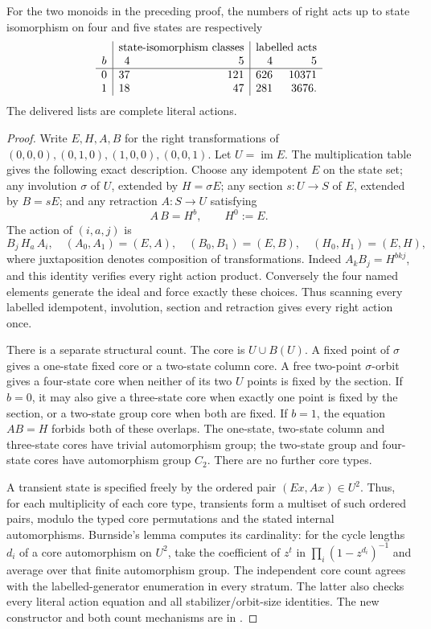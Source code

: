 \begin{lemma}
\label{CP2:A-C2-Rees-nine-acts}
For the two monoids in the preceding proof, the numbers of
right acts up to state isomorphism on four and five states
are respectively
\[
\begin{array}{c|rr|rr}
 &\multicolumn{2}{c|}{\text{state-isomorphism classes}}
 &\multicolumn{2}{c}{\text{labelled acts}}\\
 b&4&5&4&5\\\hline
 0&37&121&626&10371\\
 1&18&47&281&3676.
\end{array}
\]
The delivered lists are complete literal actions.
\end{lemma}
\begin{proof}
Write $E,H,A,B$ for the right transformations of
$(0,0,0),(0,1,0),(1,0,0),(0,0,1)$. Let $U=\operatorname{im}E$.
The multiplication table gives the following exact description.
Choose any idempotent $E$ on the state set; any involution
$\sigma$ of $U$, extended by $H=\sigma E$; any section
$s:U\to S$ of $E$, extended by $B=sE$; and any retraction
$A:S\to U$ satisfying
\[
 A\,B=H^b,
 \qquad H^0:=E.
\]
The action of $(i,a,j)$ is
\[
 B_j\,H_a\,A_i,
 \quad (A_0,A_1)=(E,A),\quad
 (B_0,B_1)=(E,B),\quad (H_0,H_1)=(E,H),
\]
where juxtaposition denotes composition of transformations.
Indeed $A_kB_j=H^{bkj}$, and this identity verifies every
right action product. Conversely the four named elements
generate the ideal and force exactly these choices. Thus
scanning every labelled idempotent, involution, section and
retraction gives every right action once.

There is a separate structural count. The core is
$U\cup B(U)$. A fixed point of $\sigma$ gives a one-state
fixed core or a two-state column core. A free two-point
$\sigma$-orbit gives a four-state core when neither of
its two $U$ points is fixed by the section. If $b=0$, it
may also give a three-state core when exactly one point
is fixed by the section, or a two-state group core when
both are fixed. If $b=1$, the equation $AB=H$ forbids
both of these overlaps. The one-state, two-state column
and three-state cores have trivial automorphism group;
the two-state group and four-state cores have automorphism
group $C_2$. There are no further core types.

A transient state is specified freely by the ordered pair
$(Ex,Ax)\in U^2$. Thus, for each multiplicity of each core
type, transients form a multiset of such ordered pairs,
modulo the typed core permutations and the stated internal
automorphisms. Burnside's lemma computes its cardinality:
for the cycle lengths $d_i$ of a core automorphism on
$U^2$, take the coefficient of $z^t$ in
$\prod_i(1-z^{d_i})^{-1}$ and average over that finite
automorphism group. The independent core count agrees
with the labelled-generator enumeration in every stratum.
The latter also checks every literal action equation and
all stabilizer/orbit-size identities. The new constructor
and both count mechanisms are in
.
\end{proof}

